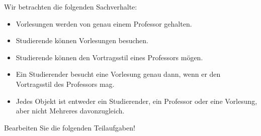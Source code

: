 \documentclass[10pt, a4paper]{exam}
\begin{document}
\begin{questions}

    \question Wir betrachten die folgenden Sachverhalte:
    \begin{itemize}
        \item Vorlesungen werden von genau einem Professor gehalten.
        \item Studierende können Vorlesungen besuchen.
        \item Studierende können den Vortragsstil eines Professors mögen.
        \item Ein Studierender besucht eine Vorlesung genau dann, wenn er den Vortragsstil des Professors mag.
        \item Jedes Objekt ist entweder ein Studierender, ein Professor oder eine Vorlesung, aber nicht Mehreres davonzugleich.
    \end{itemize}
    Bearbeiten Sie die folgenden Teilaufgaben!
    \begin{parts}

\end{parts}
\end{questions}
\end{document}
